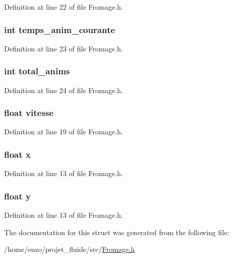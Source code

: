Definition at line 22 of file Fromage.\-h.

\hypertarget{struct_fromage_af6c2caeb693a1e84b84beecae50891b4}{
\subsubsection[{temps\-\_\-anim\-\_\-courante}]{\setlength{\rightskip}{0pt plus 5cm}int temps\-\_\-anim\-\_\-courante}}\label{struct_fromage_af6c2caeb693a1e84b84beecae50891b4}


Definition at line 23 of file Fromage.\-h.

\hypertarget{struct_fromage_a261ecb9a33ea9b7faaefeb6a4be47f5b}{
\subsubsection[{total\-\_\-anims}]{\setlength{\rightskip}{0pt plus 5cm}int total\-\_\-anims}}\label{struct_fromage_a261ecb9a33ea9b7faaefeb6a4be47f5b}


Definition at line 24 of file Fromage.\-h.

\hypertarget{struct_fromage_aef55e1775d611bfea0196692da1a0bc5}{
\subsubsection[{vitesse}]{\setlength{\rightskip}{0pt plus 5cm}float vitesse}}\label{struct_fromage_aef55e1775d611bfea0196692da1a0bc5}


Definition at line 19 of file Fromage.\-h.

\hypertarget{struct_fromage_ad0da36b2558901e21e7a30f6c227a45e}{
\subsubsection[{x}]{\setlength{\rightskip}{0pt plus 5cm}float x}}\label{struct_fromage_ad0da36b2558901e21e7a30f6c227a45e}


Definition at line 13 of file Fromage.\-h.

\hypertarget{struct_fromage_aa4f0d3eebc3c443f9be81bf48561a217}{
\subsubsection[{y}]{\setlength{\rightskip}{0pt plus 5cm}float y}}\label{struct_fromage_aa4f0d3eebc3c443f9be81bf48561a217}


Definition at line 13 of file Fromage.\-h.



The documentation for this struct was generated from the following file\-:\begin{DoxyCompactItemize}
\item 
/home/enzo/projet\-\_\-fluide/src/\hyperlink{_fromage_8h}{Fromage.\-h}\end{DoxyCompactItemize}
